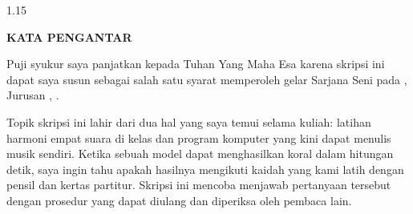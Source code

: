\newpage
{}
{}
\begin{spacing}{1.15}
\begin{center}
    \textbf{KATA PENGANTAR}
\end{center}
\vspace{0.5cm}

Puji syukur saya panjatkan kepada Tuhan Yang Maha Esa karena skripsi ini dapat saya susun sebagai salah satu syarat memperoleh gelar Sarjana Seni pada \programstudy, Jurusan \departmentname, \facultyname{} \institutionname.\par

Topik skripsi ini lahir dari dua hal yang saya temui selama kuliah: latihan harmoni empat suara di kelas dan program komputer yang kini dapat menulis musik sendiri. Ketika sebuah model dapat menghasilkan koral dalam hitungan detik, saya ingin tahu apakah hasilnya mengikuti kaidah yang kami latih dengan pensil dan kertas partitur. Skripsi ini mencoba menjawab pertanyaan tersebut dengan prosedur yang dapat diulang dan diperiksa oleh pembaca lain.\par


\end{spacing}
